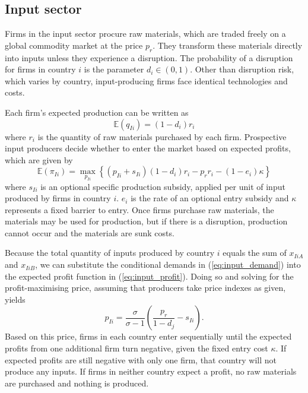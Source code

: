 \documentclass{article}
\begin{document}
\subsection{Input sector}

Firms in the input sector procure raw materials, which are traded freely on a global commodity market at the price $p_r$. They transform these materials directly into inputs unless they experience a disruption. The probability of a disruption for firms in country $i$ is the parameter $d_i \in (0, 1)$. Other than disruption risk, which varies by country, input-producing firms face identical technologies and costs.

Each firm's expected production can be written as
\begin{equation}
    \mathbb{E} (q_{Ii}) = (1 - d_i) r_i
\end{equation}
where $r_i$ is the quantity of raw materials purchased by each firm. Prospective input producers decide whether to enter the market based on expected profits, which are given by
\begin{equation} \label{eq:input_profit}
    \mathbb{E} (\pi_{Ii}) = \max_{p_{Ii}} \left\{ (p_{Ii} + s_{Ii}) (1 - d_i) r_{i} - p_r r_i - (1 - e_i) \kappa \right\}
\end{equation}
where $s_{Ii}$ is an optional specific production subsidy, applied per unit of input produced by firms in country $i$. $e_i$ is the rate of an optional entry subsidy and $\kappa$ represents a fixed barrier to entry. Once firms purchase raw materials, the materials may be used for production, but if there is a disruption, production cannot occur and the materials are sunk costs.

Because the total quantity of inputs produced by country $i$ equals the sum of $x_{IiA}$ and $x_{IiB}$, we can substitute the conditional demands in (\ref{eq:input_demand}) into the expected profit function in (\ref{eq:input_profit}). Doing so and solving for the profit-maximising price, assuming that producers take price indexes as given, yields
\begin{equation}
    p_{Ii} = \frac{\sigma}{\sigma - 1} \left( \frac{p_r}{1 - d_j} - s_{Ii} \right) .
\end{equation}
Based on this price, firms in each country enter sequentially until the expected profits from one additional firm turn negative, given the fixed entry cost $\kappa$. If expected profits are still negative with only one firm, that country will not produce any inputs. If firms in neither country expect a profit, no raw materials are purchased and nothing is produced.
\end{document}
